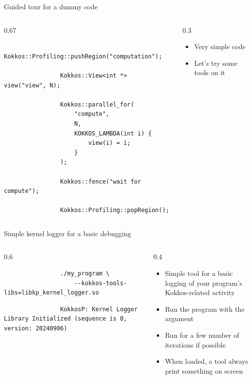 \documentclass[
    aspectratio=169,
]{beamer}
\begin{document}
\begin{frame}[fragile]{Guided tour for a dummy code}
    \begin{columns}
        \begin{column}{0.67\linewidth}
            \begin{verbatim}
                Kokkos::Profiling::pushRegion("computation");

                Kokkos::View<int *> view("view", N);

                Kokkos::parallel_for(
                    "compute",
                    N,
                    KOKKOS_LAMBDA(int i) {
                        view(i) = i;
                    }
                );

                Kokkos::fence("wait for compute");

                Kokkos::Profiling::popRegion();
            \end{verbatim}
        \end{column}
        \begin{column}{0.3\linewidth}
            \begin{itemize}
                \item Very simple code
                \item Let's try some tools on it
            \end{itemize}
        \end{column}
    \end{columns}
\end{frame}

\begin{frame}[fragile]{Simple kernel logger for a basic debugging}
    \begin{columns}
        \begin{column}{0.6\linewidth}
            \begin{verbatim}
                ./my_program \
                    --kokkos-tools-libs=libkp_kernel_logger.so
            \end{verbatim}

            \begin{verbatim}
                KokkosP: Kernel Logger Library Initialized (sequence is 0, version: 20240906)
            \end{verbatim}
        \end{column}
        \begin{column}{0.4\linewidth}
            \begin{itemize}
                \item Simple tool for a basic logging of your program's Kokkos-related activity
                \item Run the program with the argument
                \item Run for a few number of iterations if possible
                \item When loaded, a tool always print something on screen
            \end{itemize}
        \end{column}
    \end{columns}
\end{frame}
\end{document}

